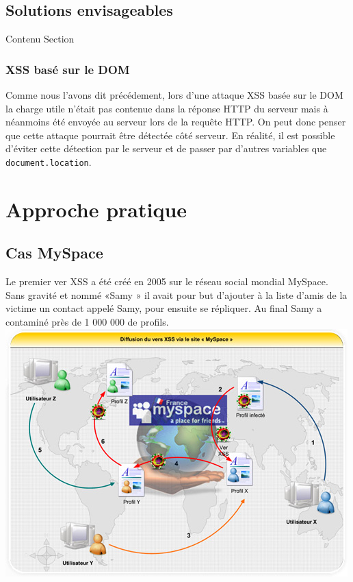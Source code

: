 \documentclass[a4paper,12pt]{report}
\begin{document}

    \newpage

  \section{Solutions envisageables}
    Contenu Section

    \subsection{XSS basé sur le DOM} %
    \label{sub:xss_bas_sur_le_dom}
    Comme nous l'avons dit précédement, lors d'une attaque XSS basée sur le DOM la charge utile n'était pas contenue dans la réponse HTTP du serveur mais à néanmoins été envoyée au serveur lors de la requête HTTP. On peut donc penser que cette attaque pourrait être détectée côté serveur. En réalité, il est possible d'éviter cette détection par le serveur et de passer par d'autres variables que \lstinline{document.location}.



    \newpage
  \chapter{Approche pratique} %

  \section{Cas MySpace}
Le premier ver XSS a été créé en 2005 sur le réseau social mondial MySpace. Sans gravité et nommé «Samy » il avait pour but d’ajouter à la liste d’amis de la victime un contact appelé Samy, pour ensuite se répliquer. Au final Samy a contaminé près de 1 000 000 de profils. \\

\includegraphics{images/versmyspace.jpg}\\
\end{document}
